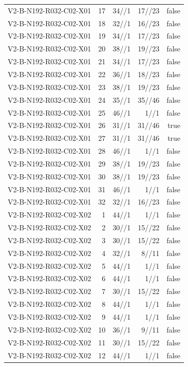 {\begin{longtable}{lrrrr}
V2-B-N192-R032-C02-X01 & 17 & 34//1 & 17//23 & false \\
V2-B-N192-R032-C02-X01 & 18 & 32//1 & 16//23 & false \\
V2-B-N192-R032-C02-X01 & 19 & 34//1 & 17//23 & false \\
V2-B-N192-R032-C02-X01 & 20 & 38//1 & 19//23 & false \\
V2-B-N192-R032-C02-X01 & 21 & 34//1 & 17//23 & false \\
V2-B-N192-R032-C02-X01 & 22 & 36//1 & 18//23 & false \\
V2-B-N192-R032-C02-X01 & 23 & 38//1 & 19//23 & false \\
V2-B-N192-R032-C02-X01 & 24 & 35//1 & 35//46 & false \\
V2-B-N192-R032-C02-X01 & 25 & 46//1 & 1//1 & false \\
V2-B-N192-R032-C02-X01 & 26 & 31//1 & 31//46 & true \\
V2-B-N192-R032-C02-X01 & 27 & 31//1 & 31//46 & true \\
V2-B-N192-R032-C02-X01 & 28 & 46//1 & 1//1 & false \\
V2-B-N192-R032-C02-X01 & 29 & 38//1 & 19//23 & false \\
V2-B-N192-R032-C02-X01 & 30 & 38//1 & 19//23 & false \\
V2-B-N192-R032-C02-X01 & 31 & 46//1 & 1//1 & false \\
V2-B-N192-R032-C02-X01 & 32 & 32//1 & 16//23 & false \\
V2-B-N192-R032-C02-X02 & 1 & 44//1 & 1//1 & false \\
V2-B-N192-R032-C02-X02 & 2 & 30//1 & 15//22 & false \\
V2-B-N192-R032-C02-X02 & 3 & 30//1 & 15//22 & false \\
V2-B-N192-R032-C02-X02 & 4 & 32//1 & 8//11 & false \\
V2-B-N192-R032-C02-X02 & 5 & 44//1 & 1//1 & false \\
V2-B-N192-R032-C02-X02 & 6 & 44//1 & 1//1 & false \\
V2-B-N192-R032-C02-X02 & 7 & 30//1 & 15//22 & false \\
V2-B-N192-R032-C02-X02 & 8 & 44//1 & 1//1 & false \\
V2-B-N192-R032-C02-X02 & 9 & 44//1 & 1//1 & false \\
V2-B-N192-R032-C02-X02 & 10 & 36//1 & 9//11 & false \\
V2-B-N192-R032-C02-X02 & 11 & 30//1 & 15//22 & false \\
V2-B-N192-R032-C02-X02 & 12 & 44//1 & 1//1 & false \\

\end{longtable}}
